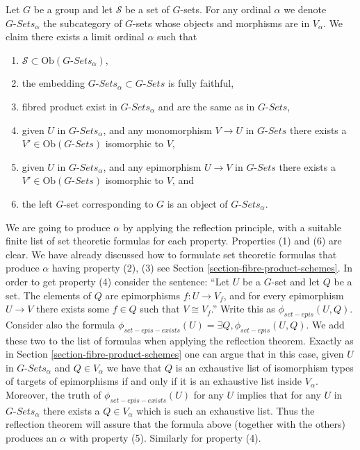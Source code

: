 \noindent
Let $G$ be a group and let $\mathcal{S}$ be a 
set of $G$-sets. For any ordinal $\alpha$ we denote
$G\textit{-Sets}_\alpha$ the subcategory of $G$-sets
whose objects and morphisms are in $V_\alpha$.
We claim there exists a limit ordinal $\alpha$ such that
\begin{enumerate}
\item $\mathcal{S} \subset \text{Ob}(G\textit{-Sets}_\alpha)$,
\item the embedding $G\textit{-Sets}_\alpha \subset G\textit{-Sets}$
is fully faithful,
\item fibred product exist in $G\textit{-Sets}_\alpha$
and are the same as in $G\textit{-Sets}$,
\item given $U$ in $G\textit{-Sets}_\alpha$, and any monomorphism
$V \to U$ in $G\textit{-Sets}$ there exists a
$V' \in \text{Ob}(G\textit{-Sets})$ isomorphic to $V$,
\item given $U$ in $G\textit{-Sets}_\alpha$, and any epimorphism
$U \to V$ in $G\textit{-Sets}$ there exists a
$V' \in \text{Ob}(G\textit{-Sets})$ isomorphic to $V$, and
\item the left $G$-set corresponding to $G$ is an object of
$G\textit{-Sets}_\alpha$.
\end{enumerate}
We are going to produce $\alpha$ by applying the reflection
principle, with a suitable finite list of set theoretic formulas
for each property. Properties (1) and (6) are clear.
We have already discussed how to formulate set
theoretic formulas that produce $\alpha$ having property (2), (3)
see Section \ref{section-fibre-product-schemes}. In order to 
get property (4) consider the sentence: ``Let $U$ be a $G$-set
and let $Q$ be a set. The elements of $Q$ are epimorphisms
$f : U \to V_f$, and for every epimorphism $U \to V$
there exists some $f \in Q$ such that $V \cong V_f$.''
Write this as $\phi_{set-epis}(U, Q)$. Consider also
the formula $\phi_{set-epis-exists}(U) = \exists Q, \phi_{set-epis}(U, Q)$.
We add these two to the list of formulas when applying the
reflection theorem. Exactly as in Section \ref{section-fibre-product-schemes}
one can argue that in this case, given $U$ in $G\textit{-Sets}_\alpha$
and $Q \in V_\alpha$ we have that $Q$ is an exhaustive list of
isomorphism types of targets of epimorphisms if and only if it is
an exhaustive list inside $V_\alpha$. Moreover, the truth of
$\phi_{set-epis-exists}(U)$ for any $U$ implies that for
any $U$ in $G\textit{-Sets}_\alpha$ there exists a 
$Q \in V_\alpha$ which is such an exhaustive list.
Thus the reflection theorem will assure that
the formula above (together with the others) produces an $\alpha$
with property (5). Similarly for property (4).

